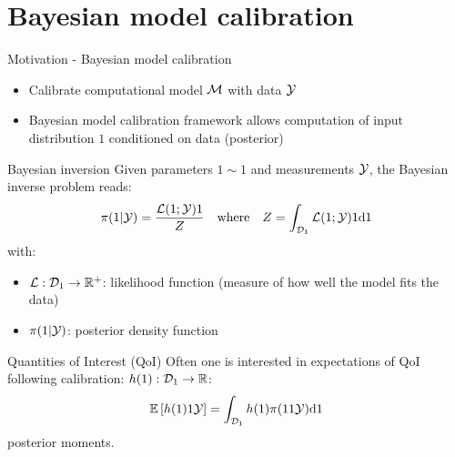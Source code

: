 \documentclass{rsuqbeamernew}
\newcommand{\BParams}{1}
\newcommand{\Bparams}{1}
\newcommand{\Bprior}{1}
\newcommand{\Bcond}{1}
\begin{document}
\section{Bayesian model calibration}
\secoutline

\begin{frame}[t]{Motivation - Bayesian model calibration}
	\small
	\\
	\begin{itemize}
		\item Calibrate {\altx computational model} ${\mathcal M}$ with {\altx data} 
		${\mathcal Y}$
		\item {\altx Bayesian model calibration} framework allows 
		computation of input distribution $\BParams$ conditioned on data 
		({\altx posterior})
	\end{itemize}
	
\end{frame}

\begin{frame}{Bayesian inversion}
	\small
	Given {\altx parameters} 
	$\BParams\sim\Bprior$ and 
	{\altx 
		measurements} 
	${\mathcal Y}$, the Bayesian inverse problem reads:
	\begin{equation*}
	\pi(\Bparams\vert\cy) = \frac{\cl(\Bparams;\cy)\Bprior}{Z} 
	\quad 
	\text{where} \quad 
	Z = \int_{\cd_{\BParams}}\cl(\Bparams;\cy)\Bprior\di{\Bparams}
	\end{equation*}
	with:
	\begin{itemize}
		\item $\cl:\cd_{\BParams}\to\mathbb{R}^{+}$: {\altx 
			likelihood 
			function} (measure of how well the model fits the data) 
		\item $\pi(\Bparams\vert\cy)$: {\altx posterior} 
		density 
		function
	\end{itemize}
	
	\pause
	\begin{block}{Quantities of Interest (QoI)}
		Often one is interested in expectations of QoI {\altx following 
			calibration}:
		$h(\Bparams):\cd_{\BParams}\to\mathbb{R}$:
		\begin{equation*}
		\Esp{h(\BParams)\Bcond\cy} = 
		\int_{\cd_{\BParams}}h(\Bparams)\pi(\Bparams\Bcond\cy)\di{\Bparams}
		\end{equation*}
		\eg{}posterior moments.
	\end{block}
\end{frame}	
\end{document}
